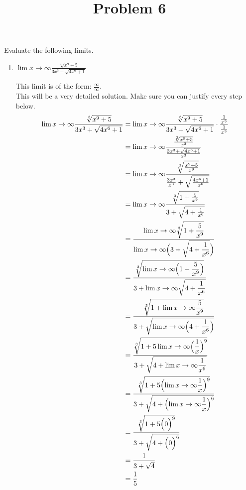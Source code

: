 \documentclass{ximera}
\title[Problem 6]{Problem 6}
\begin{document}
\begin{abstract} \end{abstract}
\maketitle


\begin{problem}
Evaluate the following limits.
	\begin{enumerate}
		\item $\displaystyle \lim{x \to \infty} \frac{\sqrt[3]{x^9+5}}{3x^3+ \sqrt{4x^6+1}}$\\[1in]
\begin{explanation}
		This limit is of the form: $\frac{\infty}{\infty}$.\\[1em]
		This will be a very detailed solution. Make sure you can justify every step below.
		\begin{align*}
		\displaystyle \lim{x \to \infty} \frac{\sqrt[3]{x^9+5}}{3x^3+ \sqrt{4x^6+1}}
		&=\displaystyle \lim{x \to \infty} \frac{\sqrt[3]{x^9+5}}{3x^3+ \sqrt{4x^6+1}}\cdot \frac{\frac{1}{x^3}}{\frac{1}{x^3}}\\
		&=\displaystyle \lim{x \to \infty} \frac{\frac{\sqrt[3]{x^9+5}}{x^3}}{\frac{3x^3+ \sqrt{4x^6+1}}{x^3}}\\
		&=\displaystyle \lim{x \to \infty}  \frac{\sqrt[3]{\frac{x^9+5}{x^9}}}{\frac{3x^3}{x^3}+ \sqrt{\frac{4x^6+1}{x^6}}}\\
		&=\displaystyle \lim{x \to \infty}  \frac{\sqrt[3]{1+\frac{5}{x^9}}}{3+ \sqrt{4+\frac{1}{x^6}}}\\
		&=  \frac{\displaystyle \lim{x \to \infty}\sqrt[3]{1+\frac{5}{x^9}}}{\displaystyle \lim{x \to \infty}\Bigl(3+ \sqrt{4+\frac{1}{x^6}}\Bigr)}\\
		&=  \frac{\sqrt[3]{\displaystyle \lim{x \to \infty}\Bigl(1+\frac{5}{x^9}\Bigr)}}{3+ \displaystyle \lim{x \to \infty}\sqrt{4+\frac{1}{x^6}}}\\
		&=  \frac{\sqrt[3]{1+\displaystyle \lim{x \to \infty}\frac{5}{x^9}}}{3+\sqrt{ \displaystyle \lim{x \to \infty}\Bigl(4+\frac{1}{x^6}\Bigr)}}\\
		&=  \frac{\sqrt[3]{1+5\displaystyle \lim{x \to \infty}\Bigl(\frac{1}{x}\Bigr)^{9}}}{3+\sqrt{4+ \displaystyle \lim{x \to \infty}\frac{1}{x^6}}}\\
		&=  \frac{\sqrt[3]{1+5\Bigl(\displaystyle \lim{x \to \infty}\frac{1}{x}\Bigr)^{9}}}{3+\sqrt{4+ \Bigl(\displaystyle \lim{x \to \infty}\frac{1}{x}\Bigr)^{6}}}\\
		&=  \frac{\sqrt[3]{1+5\Bigl(0\Bigr)^{9}}}{3+\sqrt{4+ \Bigl(0\Bigr)^{6}}}\\
		&=\frac{1}{3+ \sqrt{4}}\\
		&=\frac{1}{5}
		\end{align*}
		\end{explanation}


\end{enumerate}
\end{problem}
\end{document}
